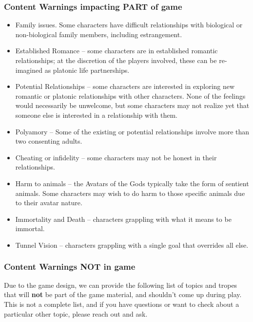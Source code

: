 \documentclass[sheet]{GL2020}
\begin{document}
\subsubsection{Content Warnings impacting PART of game}
\begin{itemize}
  	\item Family issues. Some characters have difficult relationships with biological or non-biological family members, including estrangement.
	\item Established Romance -- some characters are in established romantic relationships; at the discretion of the players involved, these can be re-imagined as platonic life partnerships.
	\item Potential Relationships -- some characters are interested in exploring new romantic or platonic relationships with other characters. None of the feelings would necessarily be unwelcome, but some characters may not realize yet that someone else is interested in a relationship with them.
	\item Polyamory -- Some of the existing or potential relationships involve more than two consenting adults.
	\item Cheating or infidelity -- some characters may not be honest in their relationships.
	\item Harm to animals -- the Avatars of the Gods typically take the form of sentient animals. Some characters may wish to do harm to those specific animals due to their avatar nature.
	\item Immortality and Death -- characters grappling with what it means to be immortal.
	\item Tunnel Vision -- characters grappling with a single goal that overrides all else.
\end{itemize}

\subsubsection{Content Warnings NOT in game}
Due to the game design, we can provide the following list of topics and tropes that will \textbf{not} be part of the game material, and shouldn’t come up during play. This is not a complete list, and if you have questions or want to check about a particular other topic, please reach out and ask.
\end{document}
